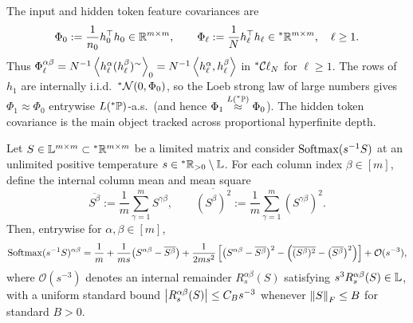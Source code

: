 \begin{definition}
\label{def:feature-cov-attn}
The input and hidden token feature covariances are
\begin{equation}
\label{eq:ch6-feature-cov}
\Phi_0 := \frac{1}{n_0} h_0^\top h_0 \in \mathbb{R}^{m \times m}, \qquad
\Phi_\ell := \frac{1}{N} h_\ell^\top h_\ell \in {}^*\mathbb{R}^{m \times m}, \quad \ell \ge 1.
\end{equation}
Thus $\Phi_\ell^{\alpha\beta} = N^{-1}\left\langle h_\ell^\alpha(h_\ell^\beta)^{\sim} \right\rangle_0 = N^{-1}\left\langle h_\ell^\alpha, h_\ell^\beta \right\rangle$ in ${}^*\mathcal{C}\ell_N$ for $\ell \ge 1$. The rows of $h_1$ are internally i.i.d.\ ${}^*\mathcal{N}(0, \Phi_0)$, so the Loeb strong law of large numbers gives $\Phi_1 \approx \Phi_0$ entrywise $L({}^*\mathbb{P})$-a.s.\ (and hence $\Phi_1 \stackrel{L({}^*\mathbb{P})}{\approx} \Phi_0$). The hidden token covariance is the main object tracked across proportional hyperfinite depth.
\end{definition}

\begin{lemma}
\label{lem:softmax-expansion}
Let $S \in \mathbb{L}^{m \times m} \subset {}^*\mathbb{R}^{m \times m}$ be a limited matrix and consider $\operatorname{Softmax}(s^{-1} S)$ at an unlimited positive temperature $s \in {}^*\mathbb{R}_{>0} \setminus \mathbb{L}$. For each column index $\beta \in [m]$, define the internal column mean and mean square
\begin{equation}
\label{eq:ch6-col-moments}
\overline{S^\beta} := \frac{1}{m}\sum_{\gamma=1}^m S^{\gamma\beta}, \qquad
\overline{(S^\beta)^2} := \frac{1}{m}\sum_{\gamma=1}^m (S^{\gamma\beta})^2.
\end{equation}
Then, entrywise for $\alpha, \beta \in [m]$,
\begin{equation}
\label{eq:ch6-softmax-taylor}
\operatorname{Softmax}(s^{-1} S)^{\alpha\beta}
= \frac{1}{m}
  + \frac{1}{ms}\bigl(S^{\alpha\beta} - \overline{S^\beta}\bigr)
  + \frac{1}{2ms^2}\left[\bigl(S^{\alpha\beta} - \overline{S^\beta}\bigr)^2 - \left(\overline{(S^\beta)^2} - \bigl(\overline{S^\beta}\bigr)^2\right)\right]
  + \mathcal{O}(s^{-3}),
\end{equation}
where $\mathcal{O}(s^{-3})$ denotes an internal remainder $R_s^{\alpha\beta}(S)$ satisfying $s^3 R_s^{\alpha\beta}(S) \in \mathbb{L}$, with a uniform standard bound $\left\lvert R_s^{\alpha\beta}(S) \right\rvert \le C_B s^{-3}$ whenever $\left\lVert S \right\rVert_F \le B$ for standard $B > 0$.
\end{lemma}

